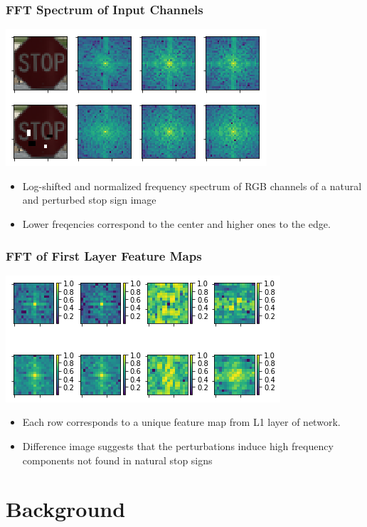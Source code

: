 \documentclass{beamer}
\begin{document}
\begin{frame}
\frametitle{FFT Spectrum of Input Channels}
\begin{center}
	\includegraphics[scale=0.7]{regular_blur.png}
\end{center}
\begin{itemize}
	\item Log-shifted and normalized frequency spectrum of RGB channels of a natural and perturbed stop sign image
	\pause
	\item Lower freqencies correspond to the center and higher ones to the edge.  
\end{itemize}
\end{frame}

\begin{frame}
\frametitle{FFT of First Layer Feature Maps}
\begin{center}
	\includegraphics[scale=0.7]{fft_filters.png}
\end{center}
\begin{itemize}
	\item Each row corresponds to a unique feature map from L1 layer of network.
	\pause
	\item Difference image suggests that the perturbations induce high frequency components not found in natural stop signs
\end{itemize}
\end{frame}

\section{Background}
\end{document}
